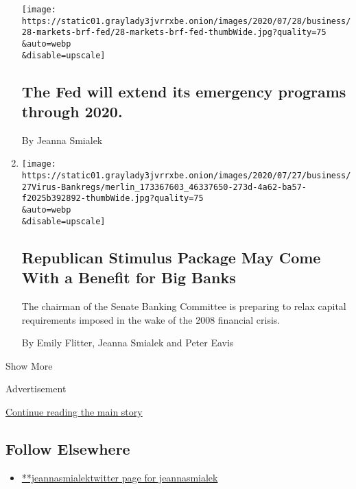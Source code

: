 \begin{enumerate}
  \texttt{[image: https://static01.graylady3jvrrxbe.onion/images/2020/07/28/business/28-markets-brf-fed/28-markets-brf-fed-thumbWide.jpg?quality=75\\\&auto=webp\\\&disable=upscale]}

  \hypertarget{the-fed-will-extend-its-emergency-programs-through-2020}{%
  \subsection{The Fed will extend its emergency programs through
  2020.}\label{the-fed-will-extend-its-emergency-programs-through-2020}}

  By Jeanna Smialek
\item
  \href{/2020/07/27/business/bank-regulations-rollback-stimulus-bill.html}{}

  \texttt{[image: https://static01.graylady3jvrrxbe.onion/images/2020/07/27/business/27Virus-Bankregs/merlin\_173367603\_46337650-273d-4a62-ba57-f2025b392892-thumbWide.jpg?quality=75\\\&auto=webp\\\&disable=upscale]}

  \hypertarget{republican-stimulus-package-may-come-with-a-benefit-for-big-banks}{%
  \subsection{Republican Stimulus Package May Come With a Benefit for
  Big
  Banks}\label{republican-stimulus-package-may-come-with-a-benefit-for-big-banks}}

  The chairman of the Senate Banking Committee is preparing to relax
  capital requirements imposed in the wake of the 2008 financial crisis.

  By Emily Flitter, Jeanna Smialek and Peter Eavis
\end{enumerate}

Show More

Advertisement

\protect\hyperlink{after-mid2}{Continue reading the main story}

\hypertarget{follow-elsewhere}{%
\subsection{Follow Elsewhere}\label{follow-elsewhere}}

\begin{itemize}
\tightlist
\item
  \href{https://twitter.com/jeannasmialek}{**jeannasmialektwitter page
  for jeannasmialek}
\end{itemize}

